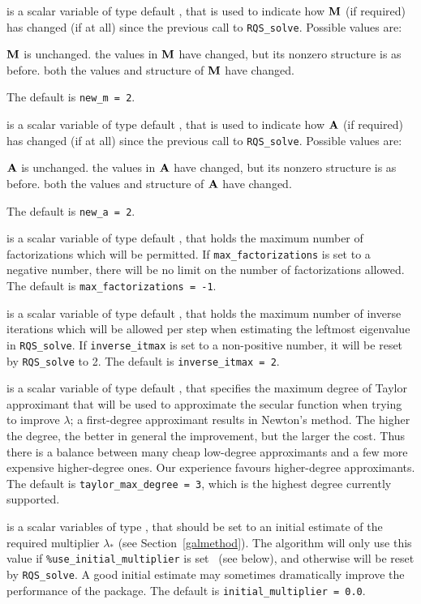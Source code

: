 \documentclass{galahad}
\newcommand{\packagename}{RQS}
\begin{document}
\begin{description}
 is a scalar variable of type default \integer, that is used
to indicate how ${\mathbf{M}}$ (if required) has changed (if at all) since the previous
call to {\tt \packagename\_solve}. Possible values are:
\begin{description}
 ${\mathbf{M}}$ is unchanged.
 the values in ${\mathbf{M}}$ have changed, but its nonzero structure
is as before.
 both the values and structure of ${\mathbf{M}}$ have changed.
\end{description}
The default is {\tt new\_m = 2}.

 is a scalar variable of type default \integer, that is used
to indicate how ${\mathbf{A}}$ (if required) has changed (if at all) since the previous
call to {\tt \packagename\_solve}. Possible values are:
\begin{description}
 ${\mathbf{A}}$ is unchanged.
 the values in ${\mathbf{A}}$ have changed, but its nonzero structure
is as before.
 both the values and structure of ${\mathbf{A}}$ have changed.
\end{description}
The default is {\tt new\_a = 2}.

 is a scalar variable of type default \integer,
that holds the maximum number of factorizations which will be permitted.
If {\tt max\_factorizations} is set to a negative number, there will be
no limit on the number of factorizations allowed.
The default is {\tt max\_factorizations = -1}.

 is a scalar variable of type default \integer, that holds
the maximum number of inverse iterations which will be allowed per step
when estimating the leftmost eigenvalue in {\tt \packagename\_solve}.
If {\tt inverse\_itmax} is set to a non-positive number, it will be reset by
{\tt \packagename\_solve} to 2.
The default is {\tt inverse\_itmax = 2}.

 is a scalar variable of type default \integer,
that specifies the maximum degree of Taylor approximant that will be used
to approximate the secular function when trying to improve $\lambda$;
a first-degree approximant results in Newton's method.
The higher the degree, the better in general the improvement, but the larger the
cost. Thus there is a balance between many cheap low-degree approximants
and a few more expensive higher-degree ones. Our experience favours
higher-degree approximants.
The default is {\tt taylor\_max\_degree = 3}, which is the highest degree
currently supported.

 is a scalar variables of type \realdp, that should
be set to an initial estimate of the required multiplier $\lambda_*$
(see Section~\ref{galmethod}). The algorithm will only use this value
if {\tt \%use\_initial\_multiplier} is set \true\ (see below), and otherwise
will be reset by {\tt \packagename\_solve}. A good initial estimate
may sometimes dramatically improve the performance of the package.
The default is {\tt initial\_multiplier = 0.0}.


\end{description}
\end{document}
